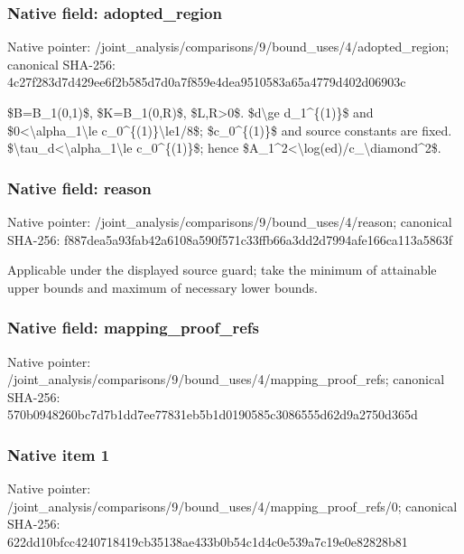 \documentclass[10pt,a4paper]{article}
\begin{document}
\subsubsection{Native field: adopted\_region}


Native pointer: /joint\_analysis/comparis\allowbreak{}ons/9/bound\_uses/4/adopt\allowbreak{}ed\_region; canonical SHA-256: 4c27f283d7d429ee6f2b585d\allowbreak{}7d0a7f859e4dea9510583a65\allowbreak{}a4779d402d06903c


\$B=B\_1(0,1)\$, \$K=B\_1(0,R)\$, \$L,R>0\$. \$d\textbackslash{}ge d\_1\textasciicircum{}\{(1)\}\$ and \$0<\textbackslash{}alpha\_1\textbackslash{}le c\_0\textasciicircum{}\{(1)\}\textbackslash{}le1/8\$; \$c\_0\textasciicircum{}\{(1)\}\$ and source constants are fixed. \$\textbackslash{}tau\_d<\textbackslash{}alpha\_1\textbackslash{}le c\_0\textasciicircum{}\{(1)\}\$; hence \$A\_1\textasciicircum{}2<\textbackslash{}log(ed)/c\_\textbackslash{}diamond\textasciicircum{}2\$.


\subsubsection{Native field: reason}


Native pointer: /joint\_analysis/comparis\allowbreak{}ons/9/bound\_uses/4/reaso\allowbreak{}n; canonical SHA-256: f887dea5a93fab42a6108a59\allowbreak{}0f571c33ffb66a3dd2d7994a\allowbreak{}fe166ca113a5863f


Applicable under the displayed source guard; take the minimum of attainable upper bounds and maximum of necessary lower bounds.


\subsubsection{Native field: mapping\_proof\_refs}


Native pointer: /joint\_analysis/comparis\allowbreak{}ons/9/bound\_uses/4/mappi\allowbreak{}ng\_proof\_refs; canonical SHA-256: 570b0948260bc7d7b1dd7ee7\allowbreak{}7831eb5b1d0190585c308655\allowbreak{}5d62d9a2750d365d



\subsubsection{Native item 1}


Native pointer: /joint\_analysis/comparis\allowbreak{}ons/9/bound\_uses/4/mappi\allowbreak{}ng\_proof\_refs/0; canonical SHA-256: 622dd10bfcc4240718419cb3\allowbreak{}5138ae433b0b54c1d4c0e539\allowbreak{}a7c19e0e82828b81
\end{document}
